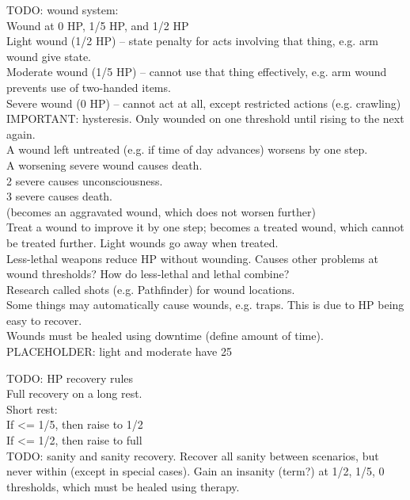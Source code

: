 \documentclass[letterpaper,titlepage,openany,twocolumn]{book}
\begin{document}
TODO: wound system:\\
	Wound at 0 HP, 1/5 HP, and 1/2 HP\\
		Light wound (1/2 HP) – state penalty for acts involving that thing, e.g. arm wound give state.\\
		Moderate wound (1/5 HP) – cannot use that thing effectively, e.g. arm wound prevents use of two-handed items.\\
		Severe wound (0 HP) – cannot act at all, except restricted actions (e.g. crawling)\\
	IMPORTANT: hysteresis. Only wounded on one threshold until rising to the next again.\\
	A wound left untreated (e.g. if time of day advances) worsens by one step.\\
		A worsening severe wound causes death.\\
		2 severe causes unconsciousness.\\
		3 severe causes death.\\
		(becomes an aggravated wound, which does not worsen further)\\
	Treat a wound to improve it by one step; becomes a treated wound, which cannot be treated further. Light wounds go away when treated.\\
	Less-lethal weapons reduce HP without wounding. Causes other problems at wound thresholds? How do less-lethal and lethal combine?\\
	Research called shots (e.g. Pathfinder) for wound locations.\\
	Some things may automatically cause wounds, e.g. traps. This is due to HP being easy to recover.\\
	Wounds must be healed using downtime (define amount of time).\\

PLACEHOLDER: light and moderate have 25%

TODO: HP recovery rules\\
	Full recovery on a long rest.\\
	Short rest:\\
		If <= 1/5, then raise to 1/2\\
		If <= 1/2, then raise to full\\

TODO: sanity and sanity recovery. Recover all sanity between scenarios, but never within (except in special cases). Gain an insanity (term?) at 1/2, 1/5, 0 thresholds, which must be healed using therapy.\\
\end{document}
